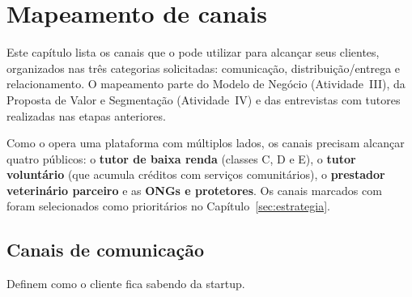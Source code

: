 \section{Mapeamento de canais}
\label{sec:mapeamento}

Este capítulo lista os canais que o \projeto{} pode utilizar para alcançar seus clientes,
organizados nas três categorias solicitadas: comunicação, distribuição/entrega e
relacionamento. O mapeamento parte do Modelo de Negócio (Atividade~III), da Proposta de Valor
e Segmentação (Atividade~IV) e das entrevistas com tutores realizadas nas etapas anteriores.

Como o \projeto{} opera uma plataforma com múltiplos lados, os canais precisam alcançar quatro
públicos: o \textbf{tutor de baixa renda} (classes C, D e E), o \textbf{tutor voluntário} (que
acumula créditos com serviços comunitários), o \textbf{prestador veterinário parceiro} e as
\textbf{ONGs e protetores}. Os canais marcados com \prio{} foram selecionados como
prioritários no Capítulo~\ref{sec:estrategia}.

\subsection{Canais de comunicação}
\label{sec:canais-comunicacao}

Definem como o cliente fica sabendo da startup.


